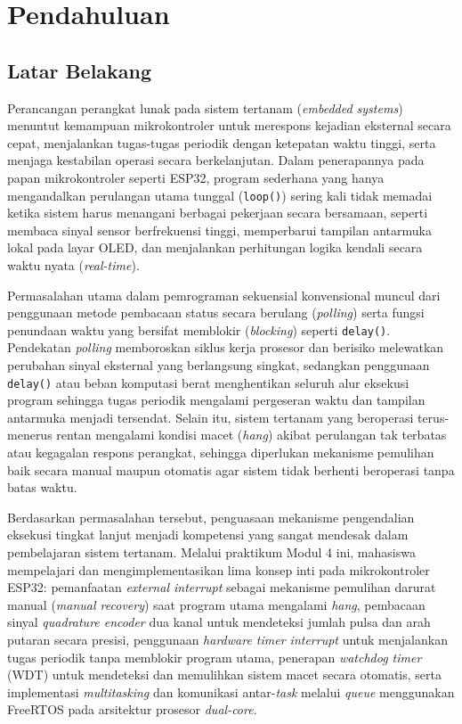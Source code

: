 \section{Pendahuluan}

\subsection{Latar Belakang}
Perancangan perangkat lunak pada sistem tertanam (\textit{embedded systems}) menuntut kemampuan mikrokontroler untuk merespons kejadian eksternal secara cepat, menjalankan tugas-tugas periodik dengan ketepatan waktu tinggi, serta menjaga kestabilan operasi secara berkelanjutan. Dalam penerapannya pada papan mikrokontroler seperti ESP32, program sederhana yang hanya mengandalkan perulangan utama tunggal (\texttt{loop()}) sering kali tidak memadai ketika sistem harus menangani berbagai pekerjaan secara bersamaan, seperti membaca sinyal sensor berfrekuensi tinggi, memperbarui tampilan antarmuka lokal pada layar OLED, dan menjalankan perhitungan logika kendali secara waktu nyata (\textit{real-time}).

Permasalahan utama dalam pemrograman sekuensial konvensional muncul dari penggunaan metode pembacaan status secara berulang (\textit{polling}) serta fungsi penundaan waktu yang bersifat memblokir (\textit{blocking}) seperti \texttt{delay()}. Pendekatan \textit{polling} memboroskan siklus kerja prosesor dan berisiko melewatkan perubahan sinyal eksternal yang berlangsung singkat, sedangkan penggunaan \texttt{delay()} atau beban komputasi berat menghentikan seluruh alur eksekusi program sehingga tugas periodik mengalami pergeseran waktu dan tampilan antarmuka menjadi tersendat. Selain itu, sistem tertanam yang beroperasi terus-menerus rentan mengalami kondisi macet (\textit{hang}) akibat perulangan tak terbatas atau kegagalan respons perangkat, sehingga diperlukan mekanisme pemulihan baik secara manual maupun otomatis agar sistem tidak berhenti beroperasi tanpa batas waktu.

Berdasarkan permasalahan tersebut, penguasaan mekanisme pengendalian eksekusi tingkat lanjut menjadi kompetensi yang sangat mendesak dalam pembelajaran sistem tertanam. Melalui praktikum Modul 4 ini, mahasiswa mempelajari dan mengimplementasikan lima konsep inti pada mikrokontroler ESP32: pemanfaatan \textit{external interrupt} sebagai mekanisme pemulihan darurat manual (\textit{manual recovery}) saat program utama mengalami \textit{hang}, pembacaan sinyal \textit{quadrature encoder} dua kanal untuk mendeteksi jumlah pulsa dan arah putaran secara presisi, penggunaan \textit{hardware timer interrupt} untuk menjalankan tugas periodik tanpa memblokir program utama, penerapan \textit{watchdog timer} (WDT) untuk mendeteksi dan memulihkan sistem macet secara otomatis, serta implementasi \textit{multitasking} dan komunikasi antar-\textit{task} melalui \textit{queue} menggunakan FreeRTOS pada arsitektur prosesor \textit{dual-core}.

